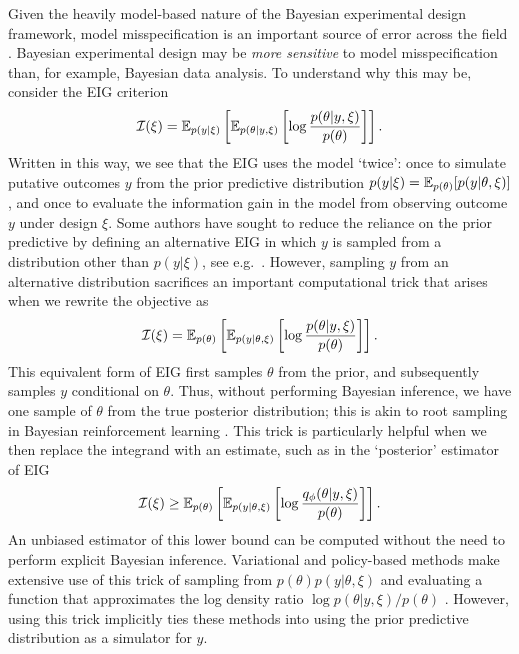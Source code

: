 \documentclass[a4paper, 10pt]{report}
\theoremstyle{plain}
\begin{document}
	Given the heavily model-based nature of the Bayesian experimental design framework, model misspecification is an important source of error across the field \citep{chaloner1995,feng2015optimal}. 
	Bayesian experimental design may be \emph{more sensitive} to model misspecification than, for example, Bayesian data analysis. To understand why this may be, consider the EIG criterion
	\begin{equation}
		\mathcal{I}(\xi) = \mathbb{E}_{p(y|\xi)}\left[\mathbb{E}_{p(\theta|y,\xi)}\left[ \log \frac{p(\theta|y,\xi)}{p(\theta)} \right]\right].
	\end{equation}
	Written in this way, we see that the EIG uses the model `twice': once to simulate putative outcomes $y$ from the prior predictive distribution $p(y|\xi) = \mathbb{E}_{p(\theta)}[p(y|\theta,\xi)]$, and once to evaluate the information gain in the model from observing outcome $y$ under design $\xi$. Some authors have sought to reduce the reliance on the prior predictive by defining an alternative EIG in which $y$ is sampled from a distribution other than $p(y|\xi)$, see e.g.~\citet{ouyang2016,overstall2021bayesian}. 
	However, sampling $y$ from an alternative distribution sacrifices an important computational trick that arises when we rewrite the objective as
	\begin{equation}
	\mathcal{I}(\xi) = \mathbb{E}_{p(\theta)}\left[\mathbb{E}_{p(y|\theta,\xi)}\left[ \log \frac{p(\theta|y,\xi)}{p(\theta)} \right]\right].
	\end{equation}
	This equivalent form of EIG first samples $\theta$ from the prior, and subsequently samples $y$ conditional on $\theta$. Thus, without performing Bayesian inference, we have one sample of $\theta$ from the true posterior distribution; this is akin to root sampling in Bayesian reinforcement learning \citep{guez2012efficient}.
	This trick is particularly helpful when we then replace the integrand with an estimate, such as in the `posterior' estimator of EIG \citep{foster2019variational}
	\begin{equation}
	\mathcal{I}(\xi) \ge \mathbb{E}_{p(\theta)}\left[\mathbb{E}_{p(y|\theta,\xi)}\left[ \log \frac{q_\phi(\theta|y,\xi)}{p(\theta)} \right]\right].
	\end{equation}
	An unbiased estimator of this lower bound can be computed without the need to perform explicit Bayesian inference.
	Variational and policy-based methods make extensive use of this trick of sampling from $p(\theta)p(y|\theta,\xi)$ and evaluating a function that approximates the log density ratio $\log p(\theta|y,\xi)/p(\theta)$ \citep{foster2020unified,foster2021dad}.
	However, using this trick implicitly ties these methods into using the prior predictive distribution as a simulator for $y$.
	
\end{document}
